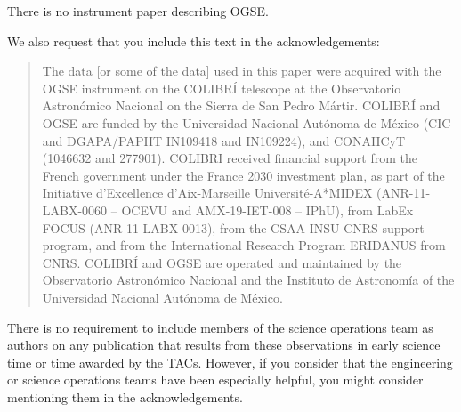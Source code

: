 There is no instrument paper describing OGSE.

We also request that you include this text in the acknowledgements:

\begin{quote}
The data [or some of the data] used in this paper were acquired with the OGSE instrument on the COLIBRÍ telescope at the Observatorio Astronómico Nacional on the Sierra de San Pedro Mártir. COLIBRÍ and OGSE are funded by the Universidad Nacional Autónoma de México (CIC and DGAPA/PAPIIT IN109418 and IN109224), and CONAHCyT (1046632 and 277901). COLIBRI received financial support from the French government under the France 2030 investment plan, as part of the Initiative d’Excellence d’Aix-Marseille Université-A*MIDEX  (ANR-11-LABX-0060 -- OCEVU and AMX-19-IET-008 -- IPhU), from LabEx FOCUS (ANR-11-LABX-0013), from the CSAA-INSU-CNRS support program, and from the International Research Program ERIDANUS from CNRS. COLIBRÍ and OGSE are operated and maintained by the Observatorio Astronómico Nacional and the Instituto de Astronomía of the Universidad Nacional Autónoma de México.
\end{quote}

There is no requirement to include members of the science operations team as authors on any publication that results from these observations in early science time or time awarded by the TACs. However, if you consider that the engineering or science operations teams have been especially helpful, you might consider mentioning them in the acknowledgements.
